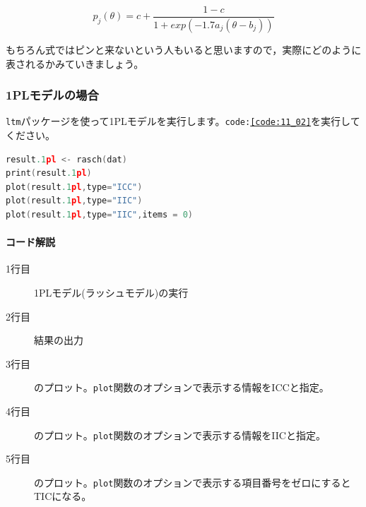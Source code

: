 \documentclass{ltjsbook}
\begin{document}
\[ p_j(\theta) =c+ \frac{1-c}{1+exp(-1.7 a_j(\theta -b_j))} \]

もちろん式ではピンと来ないという人もいると思いますので，実際にどのように表されるかみていきましょう。
\subsubsection{1PLモデルの場合}

\texttt{ltm}パッケージを使って1PLモデルを実行します。\texttt{code:\ref{code:11_02}}を実行してください。

\begin{lstlisting}[language=c++,label={code:11_02},caption={1PLモデルの実行}]
result.1pl <- rasch(dat)
print(result.1pl)
plot(result.1pl,type="ICC")
plot(result.1pl,type="IIC")
plot(result.1pl,type="IIC",items = 0)
\end{lstlisting}

\paragraph{コード解説}
\begin{description}
	\item[1行目] 1PLモデル(ラッシュモデル)の実行
	\item[2行目] 結果の出力
	\item[3行目] のプロット。\texttt{plot}関数のオプションで表示する情報をICCと指定。
	\item[4行目] のプロット。\texttt{plot}関数のオプションで表示する情報をIICと指定。
	\item[5行目] のプロット。\texttt{plot}関数のオプションで表示する項目番号をゼロにするとTICになる。
\end{description}
\end{document}
